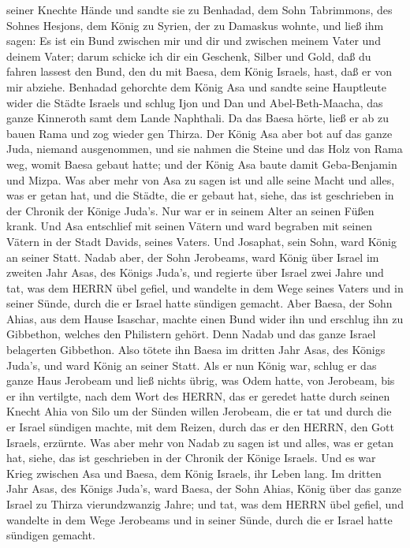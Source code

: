 seiner Knechte Hände und sandte sie zu Benhadad, dem Sohn Tabrimmons,
des Sohnes Hesjons, dem König zu Syrien, der zu Damaskus wohnte, und
ließ ihm sagen:  Es ist ein Bund zwischen mir und dir und
zwischen meinem Vater und deinem Vater; darum schicke ich dir ein
Geschenk, Silber und Gold, daß du fahren lassest den Bund, den du mit
Baesa, dem König Israels, hast, daß er von mir abziehe. 
Benhadad gehorchte dem König Asa und sandte seine Hauptleute wider die
Städte Israels und schlug Ijon und Dan und Abel-Beth-Maacha, das ganze
Kinneroth samt dem Lande Naphthali.  Da das Baesa hörte,
ließ er ab zu bauen Rama und zog wieder gen Thirza.  Der
König Asa aber bot auf das ganze Juda, niemand ausgenommen, und sie
nahmen die Steine und das Holz von Rama weg, womit Baesa gebaut hatte;
und der König Asa baute damit Geba-Benjamin und Mizpa.  Was
aber mehr von Asa zu sagen ist und alle seine Macht und alles, was er
getan hat, und die Städte, die er gebaut hat, siehe, das ist geschrieben
in der Chronik der Könige Juda's. Nur war er in seinem Alter an seinen
Füßen krank.  Und Asa entschlief mit seinen Vätern und ward
begraben mit seinen Vätern in der Stadt Davids, seines Vaters. Und
Josaphat, sein Sohn, ward König an seiner Statt.  Nadab
aber, der Sohn Jerobeams, ward König über Israel im zweiten Jahr Asas,
des Königs Juda's, und regierte über Israel zwei Jahre  und
tat, was dem HERRN übel gefiel, und wandelte in dem Wege seines Vaters
und in seiner Sünde, durch die er Israel hatte sündigen gemacht.
 Aber Baesa, der Sohn Ahias, aus dem Hause Isaschar, machte
einen Bund wider ihn und erschlug ihn zu Gibbethon, welches den
Philistern gehört. Denn Nadab und das ganze Israel belagerten Gibbethon.
 Also tötete ihn Baesa im dritten Jahr Asas, des Königs
Juda's, und ward König an seiner Statt.  Als er nun König
war, schlug er das ganze Haus Jerobeam und ließ nichts übrig, was Odem
hatte, von Jerobeam, bis er ihn vertilgte, nach dem Wort des HERRN, das
er geredet hatte durch seinen Knecht Ahia von Silo  um der
Sünden willen Jerobeam, die er tat und durch die er Israel sündigen
machte, mit dem Reizen, durch das er den HERRN, den Gott Israels,
erzürnte.  Was aber mehr von Nadab zu sagen ist und alles,
was er getan hat, siehe, das ist geschrieben in der Chronik der Könige
Israels.  Und es war Krieg zwischen Asa und Baesa, dem
König Israels, ihr Leben lang.  Im dritten Jahr Asas, des
Königs Juda's, ward Baesa, der Sohn Ahias, König über das ganze Israel
zu Thirza vierundzwanzig Jahre;  und tat, was dem HERRN
übel gefiel, und wandelte in dem Wege Jerobeams und in seiner Sünde,
durch die er Israel hatte sündigen gemacht.

